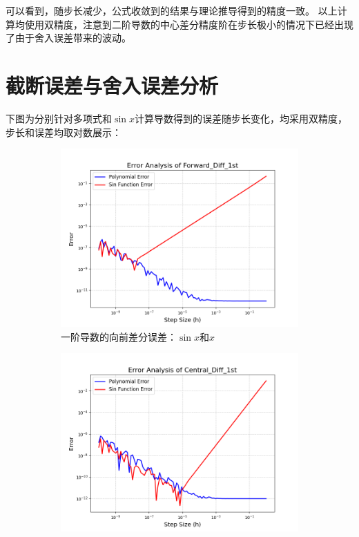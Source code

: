 \documentclass[12pt, a4paper]{article}
\begin{document}
可以看到，随步长减少，公式收敛到的结果与理论推导得到的精度一致。
以上计算均使用双精度，注意到二阶导数的中心差分精度阶在步长极小的情况下已经出现了由于舍入误差带来的波动。

\section{截断误差与舍入误差分析}
下图为分别针对多项式和$\sin x$计算导数得到的误差随步长变化，均采用双精度，步长和误差均取对数展示：
\begin{figure}[htbp]
    \centering
    \begin{subfigure}[b]{0.45\textwidth} 
        \centering
        \includegraphics[width=\textwidth]{./pictures/Error Analysis of Forward_Diff_1st.png} 
        \caption{一阶导数的向前差分误差：$\sin x$和$x$}
        \label{fig: EAF1}
    \end{subfigure}
    \hfill
    \begin{subfigure}[b]{0.45\textwidth} 
        \centering
        \includegraphics[width=\textwidth]{./pictures/Error Analysis of Central_Diff_1st.png} 

\end{subfigure}
\end{figure}
\end{document}
